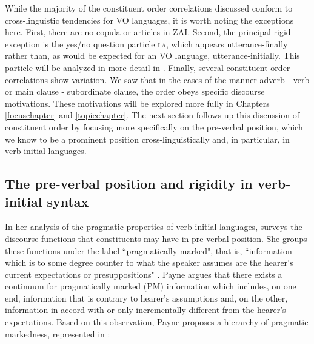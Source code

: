 While the majority of the constituent order correlations discussed conform to cross-linguistic tendencies for VO languages, it is worth noting the exceptions here. First, there are no copula or articles in ZAI. Second, the principal rigid exception is the yes/no question particle \textsc{la}, which appears utterance-finally rather than, as would be expected for an VO language, utterance-initially. This particle will be analyzed in more detail in . Finally, several constituent order correlations show variation. We saw that in the cases of the manner adverb - verb or main clause - subordinate clause, the order obeys specific discourse motivations. These motivations will be explored more fully in Chapters \ref{focuschapter} and \ref{topicchapter}. The next section follows up this discussion of constituent order by focusing more specifically on the pre-verbal position, which we know to be a prominent position cross-linguistically and, in particular, in verb-initial languages.


\subsection{The pre-verbal position and rigidity in verb-initial syntax}

In her analysis of the pragmatic properties of verb-initial languages, \citet{payne1995} surveys the discourse functions that constituents may have in pre-verbal position. She groups these functions under the label ``pragmatically marked", that is, ``information which is to some degree counter to what the speaker assumes are the hearer's current expectations or presuppositions" \citep[110]{payne1995}. Payne argues that there exists a continuum for pragmatically marked (PM) information which includes, on one end, information that is contrary to hearer's assumptions and, on the other, information in accord with or only incrementally different from the hearer's expectations. Based on this observation, Payne proposes a hierarchy of pragmatic markedness, represented in :


